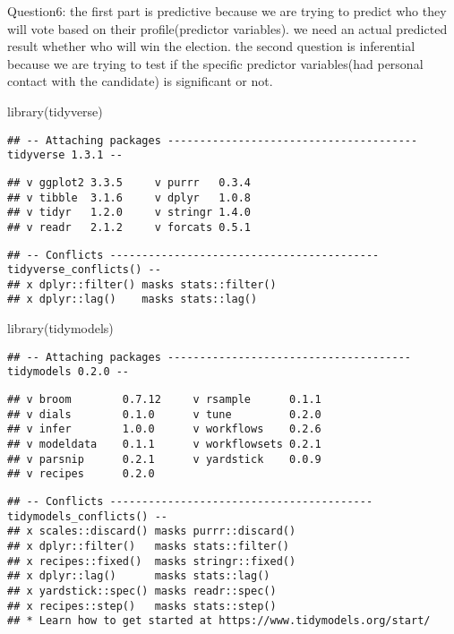 \documentclass[
]{article}
\newenvironment{Shaded}{\begin{snugshade}}{\end{snugshade}}
\newcommand{\FunctionTok}[1]{\textcolor[rgb]{0.00,0.00,0.00}{#1}}
\newcommand{\NormalTok}[1]{#1}
\begin{document}
Question6: the first part is predictive because we are trying to predict
who they will vote based on their profile(predictor variables). we need
an actual predicted result whether who will win the election. the second
question is inferential because we are trying to test if the specific
predictor variables(had personal contact with the candidate) is
significant or not.

\begin{Shaded}
\begin{Highlighting}[]
\FunctionTok{library}\NormalTok{(tidyverse)}
\end{Highlighting}
\end{Shaded}

\begin{verbatim}
## -- Attaching packages --------------------------------------- tidyverse 1.3.1 --
\end{verbatim}

\begin{verbatim}
## v ggplot2 3.3.5     v purrr   0.3.4
## v tibble  3.1.6     v dplyr   1.0.8
## v tidyr   1.2.0     v stringr 1.4.0
## v readr   2.1.2     v forcats 0.5.1
\end{verbatim}

\begin{verbatim}
## -- Conflicts ------------------------------------------ tidyverse_conflicts() --
## x dplyr::filter() masks stats::filter()
## x dplyr::lag()    masks stats::lag()
\end{verbatim}

\begin{Shaded}
\begin{Highlighting}[]
\FunctionTok{library}\NormalTok{(tidymodels)}
\end{Highlighting}
\end{Shaded}

\begin{verbatim}
## -- Attaching packages -------------------------------------- tidymodels 0.2.0 --
\end{verbatim}

\begin{verbatim}
## v broom        0.7.12     v rsample      0.1.1 
## v dials        0.1.0      v tune         0.2.0 
## v infer        1.0.0      v workflows    0.2.6 
## v modeldata    0.1.1      v workflowsets 0.2.1 
## v parsnip      0.2.1      v yardstick    0.0.9 
## v recipes      0.2.0
\end{verbatim}

\begin{verbatim}
## -- Conflicts ----------------------------------------- tidymodels_conflicts() --
## x scales::discard() masks purrr::discard()
## x dplyr::filter()   masks stats::filter()
## x recipes::fixed()  masks stringr::fixed()
## x dplyr::lag()      masks stats::lag()
## x yardstick::spec() masks readr::spec()
## x recipes::step()   masks stats::step()
## * Learn how to get started at https://www.tidymodels.org/start/
\end{verbatim}
\end{document}
